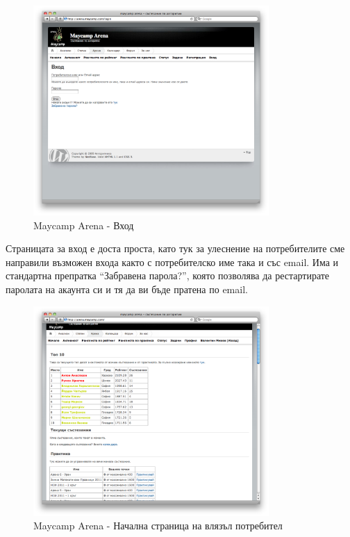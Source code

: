 \documentclass[a4paper,12pt]{article}
\begin{document}
  \begin{figure}[ht]
    \begin{center}
      \includegraphics[width=0.8\textwidth]{images/maycamp_arena_login.png}
    \end{center}
    \caption{Maycamp Arena - Вход}
    \label{arena_login}
  \end{figure}
  
  Страницата за вход е доста проста, като тук за улеснение на потребителите сме направили възможен входа както с потребителско име така и със email. Има и стандартна препратка ``Забравена парола?'', която позволява да рестартирате паролата на акаунта си и тя да ви бъде пратена по email.
  
  \begin{figure}[ht]
    \begin{center}
      \includegraphics[width=0.8\textwidth]{images/maycamp_arena_home_logged.png}
    \end{center}
    \caption{Maycamp Arena - Начална страница на влязъл потребител}
    \label{arena_homepage_logged}
  \end{figure}
  
\end{document}
